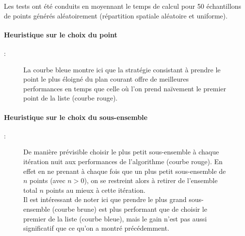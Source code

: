 \documentclass[]{article}
\begin{document}
Les tests ont été conduits en moyennant le temps de calcul pour 50 échantillons de points générés aléatoirement (répartition spatiale aléatoire et uniforme).

\paragraph{Heuristique sur le choix du point} :
\begin{figure}[H]
	\caption{La courbe bleue montre ici que la stratégie consistant à prendre le point le plus éloigné du plan courant offre de meilleures performances en temps que celle où l'on prend naïvement le premier point de la liste (courbe rouge).}
\end{figure}

\paragraph{Heuristique sur le choix du sous-ensemble} :
\begin{figure}[H]
	\caption{
		De manière prévisible choisir le plus petit sous-ensemble à chaque itération nuit aux performances de l'algorithme (courbe rouge). En effet en ne prenant à chaque fois que un plus petit sous-ensemble de $n$ points (avec $n > 0$), on se restreint alors à retirer de l'ensemble total $n$ points au mieux à cette itération.\\
		Il est intéressant de noter ici que prendre le plus grand sous-ensemble (courbe brune) est plus performant que de choisir le premier de la liste (courbe bleue), mais le gain n'est pas aussi significatif que ce qu'on a montré précédemment.
	}
\end{figure}
\end{document}
